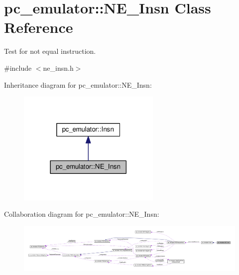 \hypertarget{classpc__emulator_1_1NE__Insn}{}\section{pc\+\_\+emulator\+:\+:N\+E\+\_\+\+Insn Class Reference}
\label{classpc__emulator_1_1NE__Insn}


Test for not equal instruction.  




{\ttfamily \#include $<$ne\+\_\+insn.\+h$>$}



Inheritance diagram for pc\+\_\+emulator\+:\+:N\+E\+\_\+\+Insn\+:
\nopagebreak
\begin{figure}[H]
\begin{center}
\leavevmode
\includegraphics[width=194pt]{classpc__emulator_1_1NE__Insn__inherit__graph}
\end{center}
\end{figure}


Collaboration diagram for pc\+\_\+emulator\+:\+:N\+E\+\_\+\+Insn\+:
\nopagebreak
\begin{figure}[H]
\begin{center}
\leavevmode
\includegraphics[width=350pt]{classpc__emulator_1_1NE__Insn__coll__graph}
\end{center}
\end{figure}
